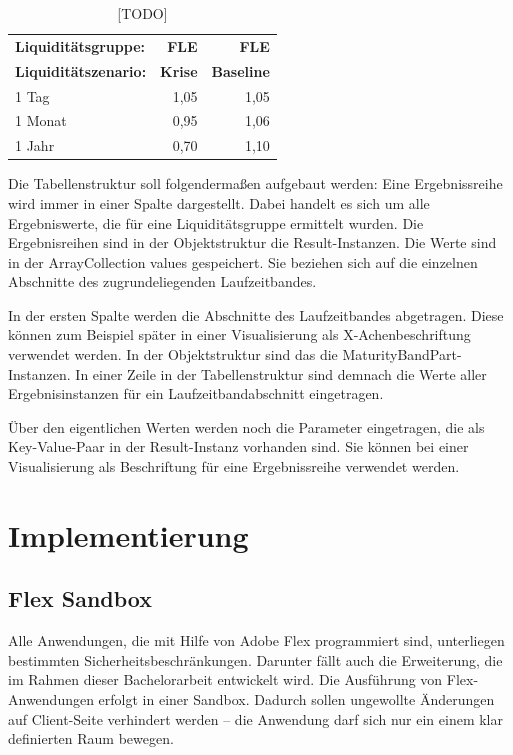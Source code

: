 \begin{table}[htbp]
  \centering
  \caption{[TODO]}
    \begin{tabular}{l|r|r}
    \toprule
    \textbf{Liquiditätsgruppe:} & \textbf{FLE} & \textbf{FLE} \\
    \textbf{Liquiditätszenario:} & \textbf{Krise} & \textbf{Baseline} \\
    \midrule
    1 Tag & 1,05  & 1,05 \\
    1 Monat & 0,95  & 1,06 \\
    1 Jahr & 0,70  & 1,10 \\
    \bottomrule
    \end{tabular}%
  \label{tab:zielstruktur}%
\end{table}%






Die Tabellenstruktur soll folgendermaßen aufgebaut werden: Eine Ergebnissreihe wird immer in einer Spalte dargestellt. Dabei handelt es sich um alle Ergebniswerte, die für eine Liquiditätsgruppe ermittelt wurden. Die Ergebnisreihen sind in der Objektstruktur die Result-Instanzen. Die Werte sind in der ArrayCollection values gespeichert. Sie beziehen sich auf die einzelnen Abschnitte des zugrundeliegenden Laufzeitbandes.

In der ersten Spalte werden die Abschnitte des Laufzeitbandes abgetragen. Diese können zum Beispiel später in einer Visualisierung als X-Achenbeschriftung verwendet werden. In der Objektstruktur sind das die MaturityBandPart-Instanzen. In einer Zeile in der Tabellenstruktur sind demnach die Werte aller Ergebnisinstanzen für ein Laufzeitbandabschnitt eingetragen.

Über den eigentlichen Werten werden noch die Parameter eingetragen, die als Key-Value-Paar in der Result-Instanz vorhanden sind. Sie können bei einer Visualisierung als Beschriftung für eine Ergebnissreihe verwendet werden.

\section{Implementierung}
\subsection{Flex Sandbox}
Alle Anwendungen, die mit Hilfe von Adobe Flex programmiert sind, unterliegen bestimmten Sicherheitsbeschränkungen. Darunter fällt auch die Erweiterung, die im Rahmen dieser Bachelorarbeit entwickelt wird. Die Ausführung von Flex-Anwendungen erfolgt in einer Sandbox. Dadurch sollen ungewollte Änderungen auf Client-Seite verhindert werden -- die Anwendung darf sich nur ein einem klar definierten Raum bewegen.


